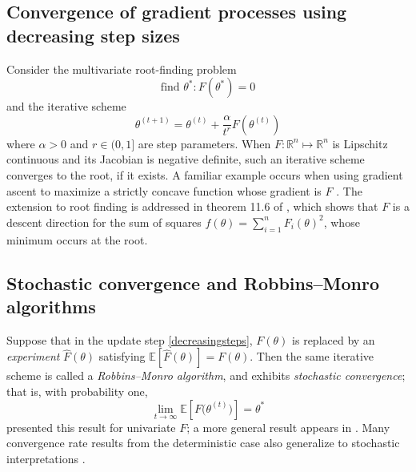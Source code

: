 \documentclass[preprint,12pt,authoryear]{elsarticle}
\begin{document}
\subsection{Convergence of gradient processes using decreasing step sizes}
Consider the multivariate root-finding problem \[\text{find } \theta^*: F(\theta^*) = 0\]
and the iterative scheme 
\begin{equation} \label{decreasingsteps}
\theta^{(t+1)} = \theta^{(t)} + \frac{\alpha}{t^r} F\left(\theta^{(t)} \right)
\end{equation}
where $\alpha >0$ and $r \in (0, 1]$ are step parameters. When $F: \mathbb{R}^n \mapsto \mathbb{R}^n$ is Lipschitz continuous and its Jacobian is negative definite, such an iterative scheme converges to the root, if it exists. A familiar example occurs when using gradient ascent to maximize a strictly concave function whose gradient is $F$ \cite[e.g.][prop. 1.2.4]{bertsekas1999}. The extension to root finding is addressed in theorem 11.6 of \cite{nocedal2006}, which shows that $F$ is a descent direction for the sum of squares $f(\theta) = \sum_{i=1}^n F_i(\theta)^2$, whose minimum occurs at the root.

\subsection{Stochastic convergence and Robbins--Monro algorithms}
Suppose that in the update step \eqref{decreasingsteps},  $F(\theta)$ is replaced by an \emph{experiment} $\hat F(\theta)$ satisfying $\mathbb{E}\left[\hat F(\theta)\right] = F(\theta)$. Then the same iterative scheme is called a \emph{Robbins--Monro algorithm}, and exhibits \emph{stochastic convergence}; that is, with probability one,\[\lim_{t\to \infty} \mathbb{E}\left[F\bigl(\theta^{(t)}\bigr)\right] = \theta^*\]
\cite{robbinsmonro1951} presented this result for univariate $F$; a more general result appears in \cite{tsitsiklis1994}. Many convergence rate results from the deterministic case also generalize to stochastic interpretations \cite[][\S10.4]{kushner1997}.

\end{document}

